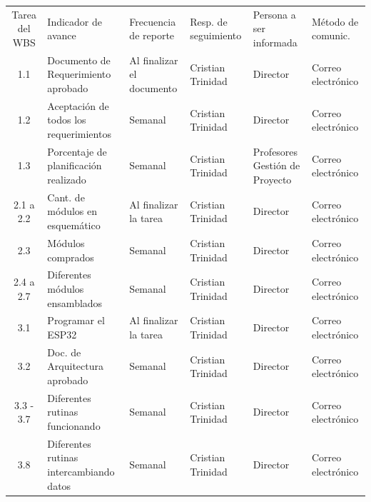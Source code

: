 \documentclass[11pt]{charter}
\begin{document}
\begin{table}[!htpb]
\centering
\begin{tabularx}{\linewidth}{@{}|c|X|X|X|X|X|@{}}
\hline
\rowcolor[HTML]{C0C0C0} 
\multicolumn{6}{|c|}{\cellcolor[HTML]{C0C0C0}SEGUIMIENTO DE AVANCE}                                                                       \\ \hline
\rowcolor[HTML]{C0C0C0} 
Tarea del WBS & Indicador de avance & Frecuencia de reporte & Resp. de seguimiento & Persona a ser informada & Método de comunic. \\ \hline
1.1 & Documento de Requerimiento aprobado & Al finalizar el documento & Cristian \newline Trinidad & Director & Correo electrónico \\ \hline
1.2 & Aceptación de todos los requerimientos & Semanal & Cristian \newline Trinidad & Director & Correo electrónico \\ \hline
1.3 & Porcentaje de planificación realizado & Semanal & Cristian \newline Trinidad & Profesores Gestión de Proyecto & Correo electrónico \\ \hline
2.1 a 2.2 & Cant. de módulos en esquemático & Al finalizar la tarea & Cristian \newline Trinidad & Director & Correo electrónico \\ \hline
2.3 & Módulos comprados & Semanal & Cristian \newline Trinidad & Director & Correo electrónico \\ \hline
2.4 a 2.7 & Diferentes módulos ensamblados & Semanal & Cristian \newline Trinidad & Director & Correo electrónico \\ \hline
3.1 & Programar el ESP32 & Al finalizar la tarea & Cristian \newline Trinidad & Director & Correo electrónico \\ \hline
3.2 & Doc. de Arquitectura aprobado & Semanal & Cristian \newline Trinidad & Director & Correo electrónico \\ \hline
3.3 - 3.7 & Diferentes rutinas funcionando & Semanal & Cristian \newline Trinidad & Director & Correo electrónico \\ \hline
3.8 & Diferentes rutinas intercambiando datos & Semanal & Cristian \newline Trinidad & Director & Correo electrónico \\ \hline

\end{tabularx}
\end{table}
\end{document}

